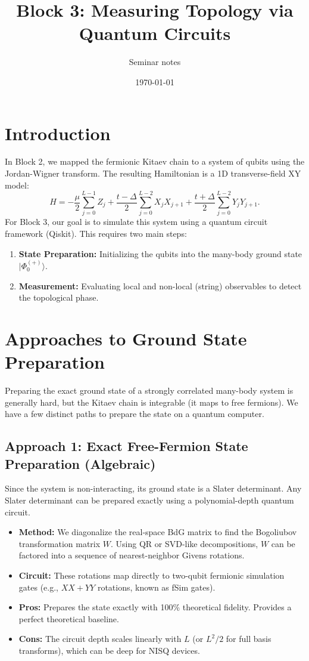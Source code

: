 \documentclass[11pt]{article}
\title{Block 3: Measuring Topology via Quantum Circuits}
\author{Seminar notes}
\date{\today}
\newcommand{\ket}[1]{|#1\rangle}
\begin{document}
\maketitle

\section{Introduction}
In Block 2, we mapped the fermionic Kitaev chain to a system of qubits using the Jordan-Wigner transform. The resulting Hamiltonian is a 1D transverse-field XY model:
\begin{equation}
  H = -\frac{\mu}{2} \sum_{j=0}^{L-1} Z_j 
      + \frac{t - \Delta}{2} \sum_{j=0}^{L-2} X_j X_{j+1} 
      + \frac{t + \Delta}{2} \sum_{j=0}^{L-2} Y_j Y_{j+1}.
\end{equation}
For Block 3, our goal is to simulate this system using a quantum circuit framework (Qiskit). This requires two main steps:
\begin{enumerate}
  \item \textbf{State Preparation:} Initializing the qubits into the many-body ground state $\ket{\Phi_0^{(+)}}$.
  \item \textbf{Measurement:} Evaluating local and non-local (string) observables to detect the topological phase.
\end{enumerate}

\section{Approaches to Ground State Preparation}
Preparing the exact ground state of a strongly correlated many-body system is generally hard, but the Kitaev chain is integrable (it maps to free fermions). We have a few distinct paths to prepare the state on a quantum computer.

\subsection{Approach 1: Exact Free-Fermion State Preparation (Algebraic)}
Since the system is non-interacting, its ground state is a Slater determinant. Any Slater determinant can be prepared exactly using a polynomial-depth quantum circuit.
\begin{itemize}
  \item \textbf{Method:} We diagonalize the real-space BdG matrix to find the Bogoliubov transformation matrix $W$. Using QR or SVD-like decompositions, $W$ can be factored into a sequence of nearest-neighbor Givens rotations.
  \item \textbf{Circuit:} These rotations map directly to two-qubit fermionic simulation gates (e.g., $XX+YY$ rotations, known as fSim gates).
  \item \textbf{Pros:} Prepares the state exactly with 100\% theoretical fidelity. Provides a perfect theoretical baseline.
  \item \textbf{Cons:} The circuit depth scales linearly with $L$ (or $L^2 / 2$ for full basis transforms), which can be deep for NISQ devices.
\end{itemize}
\end{document}

